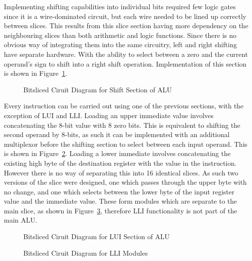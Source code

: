 Implementing shifting capabilities into individual bits required few logic gates since it is a wire-dominated circuit, but each wire needed to be lined up correctly between slices. 
This results from this slice section having more dependency on the neighbouring slices than both arithmetic and logic functions. 
Since there is no obvious way of integrating them into the same circuitry, left and right shifting have separate hardware. 
With the ability to select between a zero and the current operand's sign to shift into a right shift operation. 
Implementation of this section is shown in Figure~\ref{fig:ShiftSlice}. 

\begin{figure}[h]
	\caption{Bitsliced Ciruit Diagram for Shift Section of ALU}
	\label{fig:ShiftSlice}
\end{figure}

Every instruction can be carried out using one of the previous sections, with the exception of LUI and LLI. Loading an upper immediate value involves concatenating the 8-bit value with 8 zero bits. 
This is equivalent to shifting the second operand by 8-bits, as such it can be implemented with an additional multiplexor before the shifting section to select between each input operand. 
This is shown in Figure~\ref{fig:LUISlice}. 
Loading a lower immediate involves concatenating the existing high byte of the destination register with the value in the instruction. 
However there is no way of separating this into 16 identical slices. 
As such two versions of the slice were designed, one which passes through the upper byte with no change, and one which selects between the lower byte of the input register value and the immediate value. 
These form modules which are separate to the main slice, as shown in Figure~\ref{fig:LLISlices}, therefore LLI functionality is not part of the main ALU. 

\begin{figure}[h]
	\caption{Bitsliced Ciruit Diagram for LUI Section of ALU}
	\label{fig:LUISlice}
\end{figure}

\begin{figure}[h]
	\caption{Bitsliced Ciruit Diagram for LLI Modules}
	\label{fig:LLISlices}
\end{figure}

